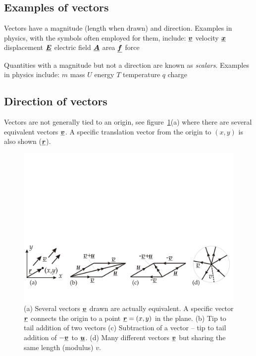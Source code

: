 



\addtolength{\topmargin}{-0.7 cm}
\setlength{\columnsep}{22pt}

\subsection*{Examples of vectors}
Vectors have a magnitude (length when drawn) and direction.  Examples in physics, with the symbols often employed for them, include:\nl
$\mathit{\underline{\boldsymbol{v}}}$ velocity \nl
$\mathit{\underline{\boldsymbol{x}}}$ displacement \nl
$\mathit{\underline{\boldsymbol{E}}}$ electric field \nl
$\mathit{\underline{\boldsymbol{A}}}$ area \nl
$\mathit{\underline{\boldsymbol{f}}}$ force \nl

\noindent Quantities with a magnitude but not a direction are known as \emph{scalars}.  Examples in physics include: \nl
$m$ mass \nl
$U$ energy \nl
$T$ temperature \nl
$q$ charge \nl

\subsection*{Direction of vectors}
Vectors are not generally tied to an origin, see
figure~\ref{fig:basic-vectors}(a) where there are several equivalent vectors $\mathit{\underline{\boldsymbol{v}}}$. A specific translation vector from the origin to $(x,y)$ is also shown ($\mathit{\underline{\boldsymbol{r}}}$).
\begin{figure}[h!]
\centering
\includegraphics[width=.9\linewidth]{../../figures/basic-vectors.svg}
\caption{(a) Several vectors $\mathit{\underline{\boldsymbol{v}}}$ drawn are actually equivalent.  A specific vector $\mathit{\underline{\boldsymbol{r}}}$ connects the origin to a point $\mathit{\underline{\boldsymbol{r}}} = (x,y)$ in the plane.  (b) Tip to tail addition of two vectors (c) Subtraction of a vector -- tip to tail addition of $-\mathit{\underline{\boldsymbol{v}}}$ to $\mathit{\underline{\boldsymbol{u}}}$.  (d) Many different vectors $\mathit{\underline{\boldsymbol{v}}}$ but sharing the same length (modulus) $v$. }\label{fig:basic-vectors}
\end{figure}
